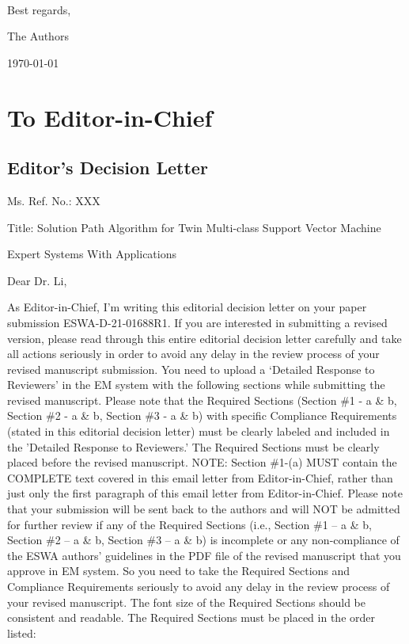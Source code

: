 \documentclass[12pt, review]{elsarticle}
\def\mycoauthor{The Authors}
\def\mydate{\today} %
\begin{document}
~\\
\noindent Best regards,

\noindent \mycoauthor

\noindent \mydate


\tableofcontents
\newpage

\section{To Editor-in-Chief}


\subsection{Editor’s Decision Letter}

Ms. Ref. No.: XXX

Title: Solution Path Algorithm for Twin Multi-class Support Vector Machine

Expert Systems With Applications

Dear Dr. Li, 

As Editor-in-Chief, I’m writing this editorial decision letter on your paper submission ESWA-D-21-01688R1.  If you are interested in submitting a revised version, please read through this entire editorial decision letter carefully and take all actions seriously in order to avoid any delay in the review process of your revised manuscript submission.  You need to upload a ‘Detailed Response to Reviewers’ in the EM system with the following sections while submitting the revised manuscript. Please note that the Required Sections (Section \#1 - a \& b, Section \#2 - a \& b, Section \#3 - a \& b) with specific Compliance Requirements (stated in this editorial decision letter) must be clearly labeled and included in the 'Detailed Response to Reviewers.’  The Required Sections must be clearly placed before the revised manuscript. NOTE: Section \#1-(a) MUST contain the COMPLETE text covered in this email letter from Editor-in-Chief, rather than just only the first paragraph of this email letter from Editor-in-Chief. Please note that your
submission will be sent back to the authors and will NOT be admitted for further review if any of the Required Sections (i.e., Section \#1 – a \& b, Section \#2 – a \& b, Section \#3 – a \& b) is incomplete or any non-compliance of the ESWA authors’ guidelines in the PDF file of the revised manuscript that you approve in EM system.  So you need to take the Required Sections and Compliance Requirements seriously to avoid any delay in the review process of your revised manuscript.  The font size of the Required Sections should be consistent and readable. The Required Sections must be placed in the order listed: 
\end{document}
